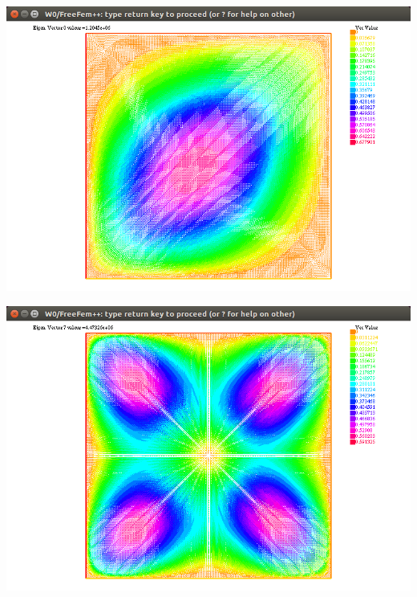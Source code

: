 \documentclass[french]{beamer}
\begin{document}
\begin{frame}
  \begin{center}
    \includegraphics[scale=0.40]{images/WF_p1d.png}
  \end{center}
\end{frame}

\begin{frame}
  \begin{center}
    \includegraphics[scale=0.4]{images/WF_p2d.png}
  \end{center}
\end{frame}
\end{document}
